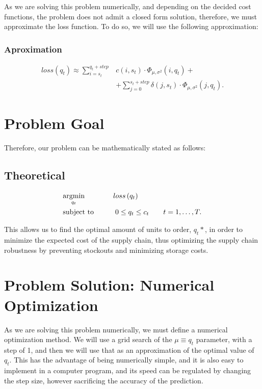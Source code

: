 \documentclass{OptiFlow}
\begin{document}
As we are solving this problem numerically, and depending on the decided cost 
functions, the problem does not admit a closed form solution, therefore, we must approximate the loss function.
To do so, we will use the following approximation:

\subsubsection{Aproximation}
\begin{align*}
	loss\left( q_t \right)  \approx \sum_{i = s_t}^{q_t+step} &c\left( i,s_t \right) \cdot \Phi_{\mu, \sigma^2}\left( i, q_t \right) + \\
	&+ \sum_{j = 0}^{s_t + step} \delta\left( j,s_t \right) \cdot \Phi_{\mu, \sigma^2}\left( j,q_t \right) 
.\end{align*}

\section{Problem Goal}
Therefore, our problem can be mathematically stated as follows:
\subsection{Theoretical}
\vspace{-5mm}
\begin{align*}
	&\underset{q_t}{\text{argmin}} \text{\qquad \qquad}loss\left( q_t \right)\\ 
	&\text{subject to}
		\text{\qquad\quad} 0 \le q_t \le  c_t \text{\qquad} t = 1,\ldots,T
.\end{align*}

This allows us to find the optimal amount of units to order, $q_t*$, in order to minimize the expected cost of the supply chain,
thus optimizing the supply chain robustness by preventing stockouts and minimizing storage costs.

\section{Problem Solution: Numerical Optimization}
As we are solving this problem numerically, we must define a numerical optimization method.
We will use a grid search of the $\mu \equiv q_t$ parameter, with a step of 1, and then we will use that as an approximation of the optimal value of $q_t$.
This has the advantage of being numerically simple, and it is also easy to implement in a computer program, and its speed can be 
regulated by changing the step size, however sacrificing the accuracy of the prediction.
\end{document}
